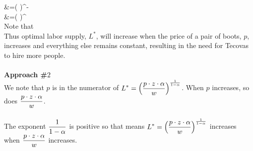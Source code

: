 \documentclass[11pt]{article}
\begin{document}
{{{{{&=\left( \right)^{-}\cdot {}\\
&=\left( \right)^{}\cdot {}\\
}
Note that 
~\\
Thus optimal labor supply, $L^*$, will increase when the price of a pair of boots, $p$, increases and everything else remains constant, resulting in the need for Tecovas to hire more people. \\
\\
{\bf Approach \#$2$}\\
We note that $p$ is in the numerator of $\displaystyle L^*=\left( \frac{p\cdot z\cdot \alpha }{w}\right)^{\frac{1}{1-\alpha}}$.  When $p$ increases, so does $\displaystyle \frac{p\cdot z\cdot \alpha }{w}$.  \\\\The exponent $\displaystyle \frac{1}{1-\alpha}$ is positive so that means $\displaystyle L^*=\left( \frac{p\cdot z\cdot \alpha }{w}\right)^{\frac{1}{1-\alpha}}$  increases when $\displaystyle \frac{p\cdot z\cdot \alpha }{w}$ increases.
\\


}}}}
\end{document}
